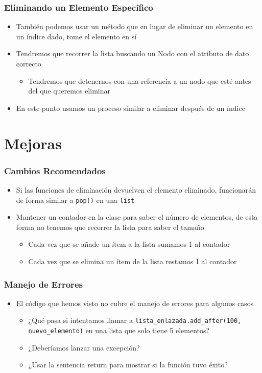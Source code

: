 \documentclass[11pt]{beamer}
\begin{document}
	\begin{frame}[fragile]
	\frametitle{Eliminando un Elemento Específico}
		\begin{itemize}
			\item También podemos usar un método que en lugar de eliminar un elemento en un índice dado, tome el elemento en sí
            \item Tendremos que recorrer la lista buscando un Nodo con el atributo de dato correcto
            \begin{itemize}
                \item Tendremos que detenernos con una referencia a un nodo que esté antes del que queremos eliminar
            \end{itemize}
            \item En este punto usamos un proceso similar a eliminar después de un índice
		\end{itemize}
\end{frame}

\section{Mejoras}

	\begin{frame}
		\frametitle{Cambios Recomendados}
		\begin{itemize}
			\item Si las funciones de eliminación devuelven el elemento eliminado, funcionarán de forma similar a \texttt{pop()} en una \texttt{list} 
			\item Mantener un contador en la clase para saber el número de elementos, de esta forma no tenemos que recorrer la lista para saber el tamaño 
			\begin{itemize}
				\item Cada vez que se añade un ítem a la lista sumamos 1 al contador
				\item Cada vez que se elimina un ítem de la lista restamos 1 al contador
			\end{itemize}
		\end{itemize}
	\end{frame}

	\begin{frame}
		\frametitle{Manejo de Errores}
		\begin{itemize}
			\item El código que hemos visto no cubre el manejo de errores para algunos casos
			\begin{itemize}
				\item ¿Qué pasa si intentamos llamar a \lstinline|lista_enlazada.add_after(100, nuevo_elemento)| en una lista que solo tiene 5 elementos?
				\item ¿Deberíamos lanzar una excepción?
				\item ¿Usar la sentencia return para mostrar si la función tuvo éxito? 
			\end{itemize}
		\end{itemize}
	\end{frame}
\end{document}
